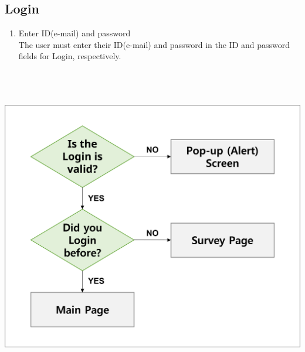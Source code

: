 \documentclass[conference]{IEEEtran}
\begin{document}
\subsection{Login}
\begin{enumerate}
    \item Enter ID(e-mail) and password\\
        The user must enter their ID(e-mail) and password in the ID and password fields for Login, respectively. \\ \\ \\ \\
\end{enumerate}
\centerline{\includegraphics[scale=0.5]{assets/flow_2.png}}
\end{document}
